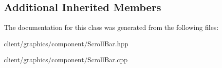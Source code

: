 \subsection*{Additional Inherited Members}


The documentation for this class was generated from the following files\-:\begin{DoxyCompactItemize}
\item 
client/graphics/component/Scroll\-Bar.\-hpp\item 
client/graphics/component/Scroll\-Bar.\-cpp\end{DoxyCompactItemize}

